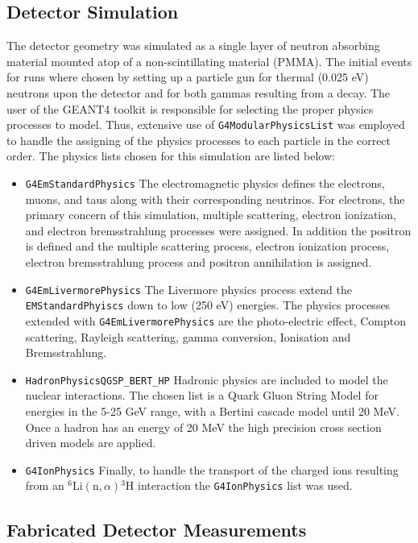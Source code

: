 \documentclass[draftcls,onecolumn]{IEEEtran}
\begin{document}
\subsection{Detector Simulation}
The detector geometry was simulated as a single layer of neutron absorbing material mounted atop of a non-scintillating material (PMMA).
The initial events for runs where chosen by setting up a particle gun for thermal (0.025 eV) neutrons upon the detector and for both gammas resulting from a  decay.
The user of the GEANT4 toolkit is responsible for selecting the proper physics processes to model.
Thus, extensive use of \verb+G4ModularPhysicsList+ was employed to handle the assigning of the physics processes to each particle in the correct order.
The physics lists chosen for this simulation are listed below:
\begin{itemize}
    \item \verb+G4EmStandardPhysics+ The electromagnetic physics defines the electrons, muons, and taus along with their corresponding neutrinos. For electrons, the primary concern of this simulation, multiple scattering, electron ionization, and electron bremsstrahlung processes were assigned.  In addition the positron is defined and the multiple scattering process, electron ionization process, electron bremsstrahlung process and positron annihilation is assigned.
    \item \verb+G4EmLivermorePhysics+ The Livermore physics process extend the \verb+EMStandardPhyiscs+ down to low (250 eV) energies. The physics processes extended with \verb+G4EmLivermorePhysics+ are the photo-electric effect, Compton scattering, Rayleigh scattering, gamma conversion, Ionisation and Bremsstrahlung. 
    \item \verb+HadronPhysicsQGSP_BERT_HP+  Hadronic physics are included to model the nuclear interactions. The chosen list is a Quark Gluon String Model for energies in the 5-25 GeV range, with a Bertini cascade model until 20 MeV.  Once a hadron has an energy of 20 MeV the high precision cross section driven models are applied.
    \item \verb+G4IonPhysics+ Finally, to handle the transport of the charged ions resulting from an ${}^6\text{Li}(\text{n},\alpha){}^{3}\text{H}$ interaction the \verb+G4IonPhysics+ list was used.
\end{itemize}


\subsection{Fabricated Detector Measurements}
\end{document}
